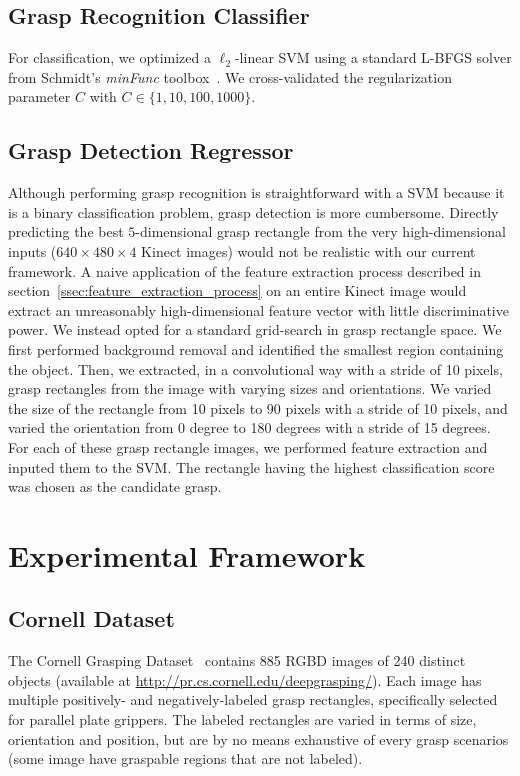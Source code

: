 \documentclass[svgnames]{scrartcl}
\begin{document}
\subsection{Grasp Recognition Classifier}

For classification, we optimized a $\ell_2$-linear SVM using a standard L-BFGS solver from Schmidt's \textit{minFunc} toolbox~\citep{minFunc}. We cross-validated the regularization parameter $C$ with $C \in \{1, 10, 100, 1000\}$.

\subsection{Grasp Detection Regressor}


Although performing grasp recognition is straightforward with a SVM because it is a binary classification problem, grasp detection is more cumbersome. Directly predicting the best $5$-dimensional grasp rectangle from the very high-dimensional inputs ($640 \times 480 \times 4$ Kinect images) would not be realistic with our current framework. A naive application of the feature extraction process described in section~\ref{ssec:feature_extraction_process} on an entire Kinect image would extract an unreasonably high-dimensional feature vector with little discriminative power. We instead opted for a standard grid-search in grasp rectangle space. We first performed background removal and identified the smallest region containing the object. Then, we extracted, in a convolutional way with a stride of 10 pixels, grasp rectangles from the image with varying sizes and orientations. We varied the size of the rectangle from 10 pixels to 90 pixels with a stride of 10 pixels, and varied the orientation from 0 degree to 180 degrees with a stride of 15 degrees. For each of these grasp rectangle images, we performed feature extraction and inputed them to the SVM. The rectangle having the highest classification score was chosen as the candidate grasp.


\section{Experimental Framework}
\label{sec:experimental_framework}

\subsection{Cornell Dataset}

The Cornell Grasping Dataset~\citep{jiang2011efficient} contains 885 RGBD images of 240 distinct objects (available at \url{http://pr.cs.cornell.edu/deepgrasping/}). Each image has multiple positively- and negatively-labeled grasp rectangles, specifically selected for parallel plate grippers. The labeled rectangles are varied in terms of size, orientation and position, but are by no means exhaustive of every grasp scenarios (some image have graspable regions that are not labeled).
\end{document}
